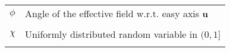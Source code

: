 \begin{longtable}[l]{p{60pt} p{350pt}}


	$\phi$ & Angle of the effective field w.r.t. easy axis $\boldsymbol{\mathbf{u}}$ \\
	&\\

	$\chi$ & Uniformly distributed random variable in $(0, 1]$ \\
	&\\
\end{longtable}
